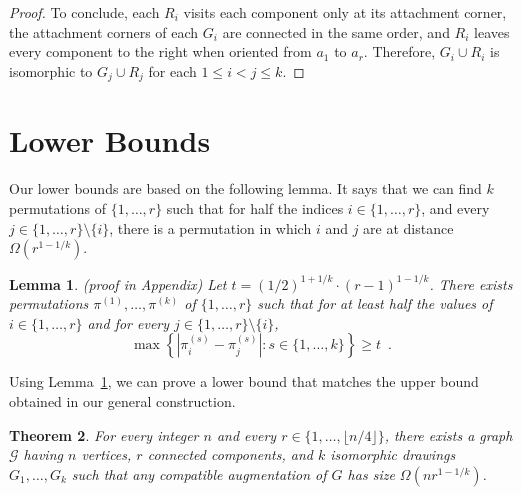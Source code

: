 \documentclass{patmorin}
\newcommand{\appendixproof}{(proof in Appendix)\xspace}
\newtheorem{theorem}{Theorem}[section]
\newtheorem{lemma}[theorem]{Lemma}
\DeclareMathOperator{\rank}{rank}
\begin{document}
\begin{proof}

To conclude, each $R_i$ visits each component only at its attachment corner, the attachment corners of each $G_i$ are connected in the same order, and $R_i$ leaves every component to the right when oriented from $a_1$ to $a_r$. Therefore, $G_i\cup R_i$ is isomorphic to $G_j\cup R_j$ for each $1\leq i<j\leq k$.
\end{proof}

\section{Lower Bounds}\label{section:Lower bound}
\vspace{-.1in}
Our lower bounds are based on the following lemma. It says that we can find $k$ permutations of $\{1,\ldots,r\}$ such that for half the indices $i\in\{1,\ldots,r\}$, and every $j\in\{1,\ldots,r\}\setminus\{i\}$, there is a permutation in which $i$ and $j$ are at distance $\Omega(r^{1-1/k})$.

\begin{lemma}\label{lem:permutations}\appendixproof
Let $t=(1/2)^{1+1/k}\cdot(r-1)^{1-1/k}$.  There exists permutations $\pi^{(1)},\ldots,\pi^{(k)}$ of $\{1,\ldots,r\}$ such that for at least half the values of $i\in\{1,\ldots,r\}$ and for every $j\in\{1,\ldots,r\}\setminus\{i\}$,
\begin{equation}
 \max\left\{\left|\pi^{(s)}_i-\pi^{(s)}_j\right|\colon s\in\{1,\ldots,k\} \right\}
 \ge t \enspace .
     \label{eq:perm}
\end{equation}
\end{lemma}

Using Lemma~\ref{lem:permutations}, we can prove a lower bound that matches the upper bound obtained in our general construction.

\begin{theorem}\label{thm:lower-bound}
  For every integer $n$ and every $r\in\{1,\ldots,\lfloor n/4\rfloor\}$,
  there exists a graph $\mathcal G$ having $n$ vertices, $r$ connected
  components, and $k$ isomorphic drawings $G_1,\ldots,G_k$ such that
  any compatible augmentation of $G$ has size $\Omega(nr^{1-1/k})$.
\end{theorem}
\end{document}
